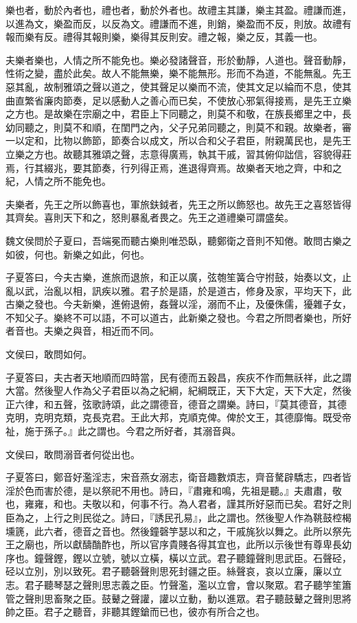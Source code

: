 樂也者，動於內者也，禮也者，動於外者也。故禮主其謙，樂主其盈。禮謙而進，以進為文，樂盈而反，以反為文。禮謙而不進，則銷，樂盈而不反，則放。故禮有報而樂有反。禮得其報則樂，樂得其反則安。禮之報，樂之反，其義一也。

夫樂者樂也，人情之所不能免也。樂必發諸聲音，形於動靜，人道也。聲音動靜，性術之變，盡於此矣。故人不能無樂，樂不能無形。形而不為道，不能無亂。先王惡其亂，故制雅頌之聲以道之，使其聲足以樂而不流，使其文足以綸而不息，使其曲直繁省廉肉節奏，足以感動人之善心而已矣，不使放心邪氣得接焉，是先王立樂之方也。是故樂在宗廟之中，君臣上下同聽之，則莫不和敬，在族長鄉里之中，長幼同聽之，則莫不和順，在閨門之內，父子兄弟同聽之，則莫不和親。故樂者，審一以定和，比物以飾節，節奏合以成文，所以合和父子君臣，附親萬民也，是先王立樂之方也。故聽其雅頌之聲，志意得廣焉，執其干戚，習其俯仰詘信，容貌得莊焉，行其綴兆，要其節奏，行列得正焉，進退得齊焉。故樂者天地之齊，中和之紀，人情之所不能免也。

夫樂者，先王之所以飾喜也，軍旅鈇鉞者，先王之所以飾怒也。故先王之喜怒皆得其齊矣。喜則天下和之，怒則暴亂者畏之。先王之道禮樂可謂盛矣。

魏文侯問於子夏曰，吾端冕而聽古樂則唯恐臥，聽鄭衛之音則不知倦。敢問古樂之如彼，何也。新樂之如此，何也。

子夏答曰，今夫古樂，進旅而退旅，和正以廣，弦匏笙簧合守拊鼓，始奏以文，止亂以武，治亂以相，訊疾以雅。君子於是語，於是道古，修身及家，平均天下，此古樂之發也。今夫新樂，進俯退俯，姦聲以淫，溺而不止，及優侏儒，獶雜子女，不知父子。樂終不可以語，不可以道古，此新樂之發也。今君之所問者樂也，所好者音也。夫樂之與音，相近而不同。

文侯曰，敢問如何。

子夏答曰，夫古者天地順而四時當，民有德而五穀昌，疾疢不作而無祅祥，此之謂大當。然後聖人作為父子君臣以為之紀綱，紀綱既正，天下大定，天下大定，然後正六律，和五聲，弦歌詩頌，此之謂德音，德音之謂樂。詩曰，『莫其德音，其德克明，克明克類，克長克君。王此大邦，克順克俾。俾於文王，其德靡悔。既受帝祉，施于孫子。』此之謂也。今君之所好者，其溺音與。

文侯曰，敢問溺音者何從出也。

子夏答曰，鄭音好濫淫志，宋音燕女溺志，衛音趣數煩志，齊音驁辟驕志，四者皆淫於色而害於德，是以祭祀不用也。詩曰，『肅雍和鳴，先祖是聽。』夫肅肅，敬也，雍雍，和也。夫敬以和，何事不行。為人君者，謹其所好惡而已矣。君好之則臣為之，上行之則民從之。詩曰，『誘民孔易』，此之謂也。然後聖人作為鞉鼓椌楬壎篪，此六者，德音之音也。然後鐘磬竽瑟以和之，干戚旄狄以舞之。此所以祭先王之廟也，所以獻醻酳酢也，所以官序貴賤各得其宜也，此所以示後世有尊卑長幼序也。鐘聲鏗，鏗以立號，號以立橫，橫以立武。君子聽鐘聲則思武臣。石聲硁，硁以立別，別以致死。君子聽磬聲則思死封疆之臣。絲聲哀，哀以立廉，廉以立志。君子聽琴瑟之聲則思志義之臣。竹聲濫，濫以立會，會以聚眾。君子聽竽笙簫管之聲則思畜聚之臣。鼓鼙之聲讙，讙以立動，動以進眾。君子聽鼓鼙之聲則思將帥之臣。君子之聽音，非聽其鏗鎗而已也，彼亦有所合之也。

